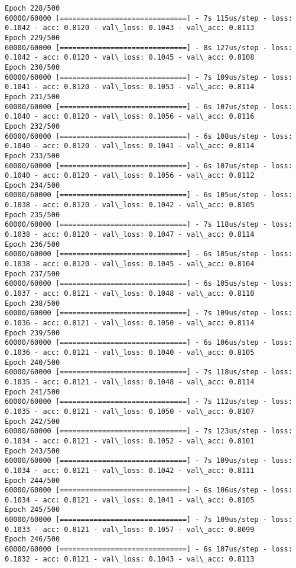 \documentclass[11pt]{article}
\begin{document}
\begin{Verbatim}[commandchars=\\\{\}]
Epoch 228/500
60000/60000 [==============================] - 7s 115us/step - loss: 0.1042 - acc: 0.8120 - val\_loss: 0.1043 - val\_acc: 0.8113
Epoch 229/500
60000/60000 [==============================] - 8s 127us/step - loss: 0.1042 - acc: 0.8120 - val\_loss: 0.1045 - val\_acc: 0.8108
Epoch 230/500
60000/60000 [==============================] - 7s 109us/step - loss: 0.1041 - acc: 0.8120 - val\_loss: 0.1053 - val\_acc: 0.8114
Epoch 231/500
60000/60000 [==============================] - 6s 107us/step - loss: 0.1040 - acc: 0.8120 - val\_loss: 0.1056 - val\_acc: 0.8116
Epoch 232/500
60000/60000 [==============================] - 6s 108us/step - loss: 0.1040 - acc: 0.8120 - val\_loss: 0.1041 - val\_acc: 0.8114
Epoch 233/500
60000/60000 [==============================] - 6s 107us/step - loss: 0.1040 - acc: 0.8120 - val\_loss: 0.1056 - val\_acc: 0.8112
Epoch 234/500
60000/60000 [==============================] - 6s 105us/step - loss: 0.1038 - acc: 0.8120 - val\_loss: 0.1042 - val\_acc: 0.8105
Epoch 235/500
60000/60000 [==============================] - 7s 118us/step - loss: 0.1038 - acc: 0.8120 - val\_loss: 0.1047 - val\_acc: 0.8114
Epoch 236/500
60000/60000 [==============================] - 6s 105us/step - loss: 0.1038 - acc: 0.8120 - val\_loss: 0.1045 - val\_acc: 0.8104
Epoch 237/500
60000/60000 [==============================] - 6s 105us/step - loss: 0.1037 - acc: 0.8121 - val\_loss: 0.1048 - val\_acc: 0.8110
Epoch 238/500
60000/60000 [==============================] - 7s 109us/step - loss: 0.1036 - acc: 0.8121 - val\_loss: 0.1050 - val\_acc: 0.8114
Epoch 239/500
60000/60000 [==============================] - 6s 106us/step - loss: 0.1036 - acc: 0.8121 - val\_loss: 0.1040 - val\_acc: 0.8105
Epoch 240/500
60000/60000 [==============================] - 7s 118us/step - loss: 0.1035 - acc: 0.8121 - val\_loss: 0.1048 - val\_acc: 0.8114
Epoch 241/500
60000/60000 [==============================] - 7s 112us/step - loss: 0.1035 - acc: 0.8121 - val\_loss: 0.1050 - val\_acc: 0.8107
Epoch 242/500
60000/60000 [==============================] - 7s 123us/step - loss: 0.1034 - acc: 0.8121 - val\_loss: 0.1052 - val\_acc: 0.8101
Epoch 243/500
60000/60000 [==============================] - 7s 109us/step - loss: 0.1034 - acc: 0.8121 - val\_loss: 0.1042 - val\_acc: 0.8111
Epoch 244/500
60000/60000 [==============================] - 6s 106us/step - loss: 0.1034 - acc: 0.8121 - val\_loss: 0.1041 - val\_acc: 0.8105
Epoch 245/500
60000/60000 [==============================] - 7s 109us/step - loss: 0.1033 - acc: 0.8121 - val\_loss: 0.1057 - val\_acc: 0.8099
Epoch 246/500
60000/60000 [==============================] - 6s 107us/step - loss: 0.1032 - acc: 0.8121 - val\_loss: 0.1043 - val\_acc: 0.8113

\end{Verbatim}
\end{document}
